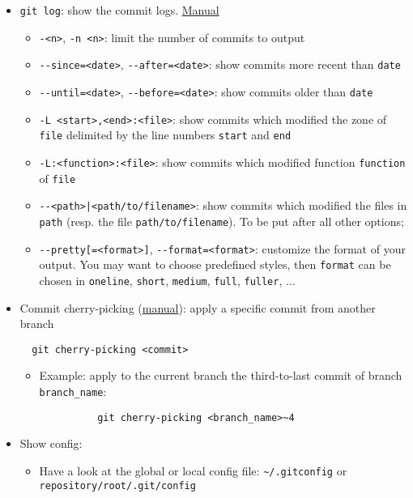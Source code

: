 \documentclass[a4paper,12pt,%
              final%
              ]{article}
\begin{document}
\begin{itemize}
\begin{itemize}
    \end{itemize}
  \item \texttt{git log}: show the commit logs. \href{https://git-scm.com/docs/git-log}{Manual}
    \begin{itemize}
      \item \texttt{-<n>}, \texttt{-n <n>}: limit the number of commits to output
      \item \verb|--since=<date>|, \verb|--after=<date>|: show commits more recent than \texttt{date}
      \item \verb|--until=<date>|, \verb|--before=<date>|: show commits older than \texttt{date}
      \item \verb|-L <start>,<end>:<file>|: show commits which modified the zone of \texttt{file} delimited by the line numbers \texttt{start} and \texttt{end}
      \item \verb|-L:<function>:<file>|: show commits which modified function \texttt{function} of \texttt{file}
      \item \verb!--<path>|<path/to/filename>!: show commits which modified the files in \texttt{path} (resp. the file \verb|path/to/filename|). To be put after all other options;
      \item \verb|--pretty[=<format>]|, \verb|--format=<format>|: customize the format of your output. You may want to choose predefined styles, then \texttt{format} can be chosen in \texttt{oneline}, \texttt{short}, \texttt{medium}, \texttt{full}, \texttt{fuller}, ...
    \end{itemize}
  \item Commit cherry-picking (\href{https://git-scm.com/docs/git-cherry-pick}{manual}): apply a specific commit from another branch
\begin{verbatim}
  git cherry-picking <commit>
\end{verbatim}
    \begin{itemize}
      \item Example: apply to the current branch the third-to-last commit of branch \verb|branch_name|:
        \begin{verbatim}
          git cherry-picking <branch_name>~4
        \end{verbatim}
    \end{itemize}
  \item Show config: 
    \begin{itemize}
      \item Have a look at the global or local config file: \verb|~/.gitconfig| or \verb|repository/root/.git/config|

\end{itemize}
\end{itemize}
\end{document}
